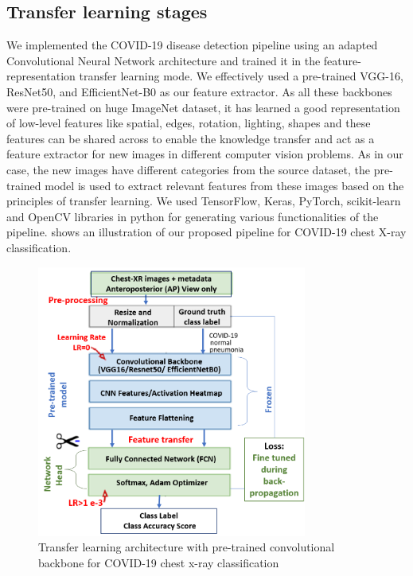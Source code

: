 \subsection{Transfer learning stages}
We implemented the COVID-19 disease detection pipeline using an adapted Convolutional Neural Network architecture and trained it in the feature-representation transfer learning mode. We effectively used a pre-trained  VGG-16, ResNet50, and EfficientNet-B0 as our feature extractor. As all these backbones were pre-trained on huge ImageNet dataset, it has learned a good representation of low-level features like spatial, edges, rotation, lighting, shapes and these features can be shared across to enable the knowledge transfer and act as a feature extractor for new images in different computer vision problems.  As in our case, the new images have different categories from the source dataset, the pre-trained model is used to extract relevant features from these images based on the principles of transfer learning. We used TensorFlow, Keras, PyTorch, scikit-learn and OpenCV libraries in python for generating various functionalities of the pipeline.  shows an illustration of our proposed pipeline for COVID-19 chest X-ray classification.
\begin{figure}
\centering
\includegraphics[width=0.79\textwidth]{images/Architecture_covid19.png}
   \caption{Transfer learning architecture with pre-trained convolutional backbone for COVID-19 chest x-ray classification}
\label{fig:architecture}

\end{figure}

